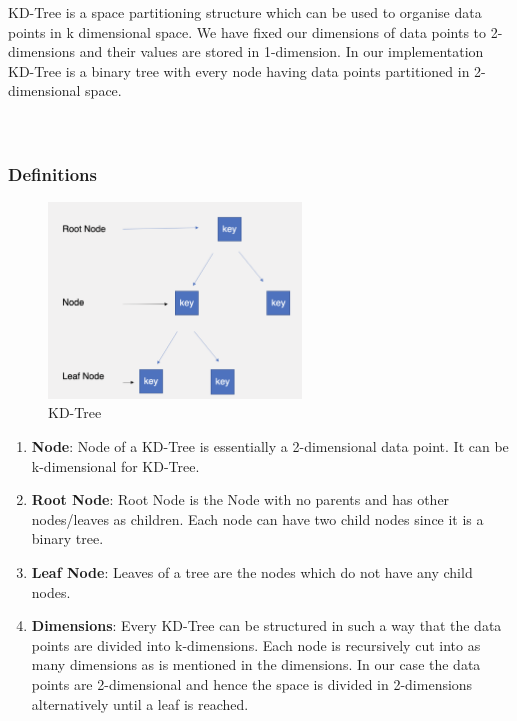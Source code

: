 KD-Tree is a space partitioning structure which can be used to organise data points in k dimensional space. We have fixed our dimensions of data points  to 2-dimensions and their values are stored in 1-dimension. In our implementation KD-Tree is a binary tree with every node having data points partitioned in 2-dimensional space.\\\\\

\subsubsection{Definitions}

\begin{figure}[htp]
    \centering
    \includegraphics[width=0.6\textwidth]{graphs/KD-Tree.png}
    \caption{KD-Tree}
    \label{fig:KD-Tree}
\end{figure}

\begin{enumerate}
    \item\textbf{{Node}}: Node of a KD-Tree is essentially a 2-dimensional data point. It can be k-dimensional for KD-Tree.
    \item\textbf{{Root Node}}: Root Node is the Node with no parents and has other nodes/leaves as children. Each node can have two child nodes since it is a binary tree. 
    \item\textbf{{Leaf Node}}: Leaves of a tree are the nodes which do not have any child nodes.
    \item\textbf{{Dimensions}}: Every KD-Tree can be structured in such a way that the data points are divided into k-dimensions. Each node is recursively cut into as many dimensions as is mentioned in the dimensions. In our case the data points are 2-dimensional and hence the space is divided in 2-dimensions alternatively until a leaf is reached.\\
\end{enumerate}
    
